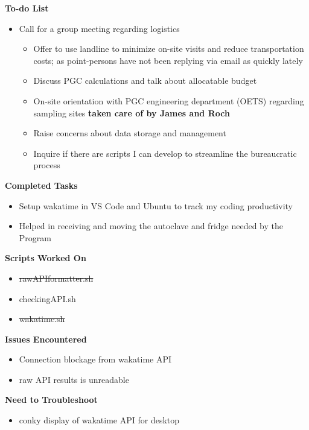 \documentclass[11pt]{report}
\newcommand{\done}{\checkmark}
\newcommand{\moved}{\faArrowCircleRight}
\newcommand{\deprecated}[1]{\sout{#1}}
\begin{document}
{\textbf{To-do List}
\begin{itemize}
	\item [\moved] Call for a group meeting regarding logistics 
	
	\begin{itemize}
		\item [\done] Offer to use landline to minimize on-site visits and reduce transportation costs; as point-persons have not been replying via email as quickly lately
		\item [\done] Discuss PGC calculations and talk about allocatable budget
		\item [\done] On-site orientation with PGC engineering department (OETS) regarding sampling sites \textbf{taken care of by James and Roch}
		\item [\moved] Raise concerns about data storage and management
		\item [\moved] Inquire if there are scripts I can develop to streamline the bureaucratic process
	\end{itemize}
\end{itemize}

\textbf{Completed Tasks}
\begin{itemize}
	\item Setup wakatime in VS Code and Ubuntu to track my coding productivity
	\item Helped in receiving and moving the autoclave and fridge needed by the Program
	
\end{itemize}

\textbf{Scripts Worked On}
\begin{itemize}
	\item \deprecated{rawAPIformatter.sh}
	\item [\done] checkingAPI.sh
	\item \deprecated{wakatime.sh}
\end{itemize}


\textbf{Issues Encountered}
\begin{itemize}
	\item [\done] Connection blockage from wakatime API
	\item [\moved] raw API results is unreadable
\end{itemize}

\textbf{Need to Troubleshoot}
\begin{itemize}
	\item conky display of wakatime API for desktop
\end{itemize}


}
\end{document}
